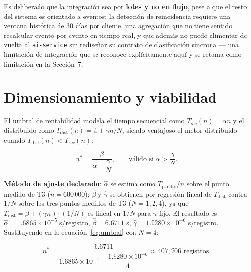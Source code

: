\documentclass[11pt]{article}
\begin{document}
Es deliberado que la integración sea por \textbf{lotes y no en flujo},
pese a que el resto del sistema es orientado a eventos: la detección de
reincidencia requiere una ventana histórica de 30 días por cliente, una
agregación que no tiene sentido recalcular evento por evento en tiempo
real, y que además no puede alimentar de vuelta al \texttt{ai-service}
sin rediseñar su contrato de clasificación síncrona --- una limitación
de integración que se reconoce explícitamente aquí y se retoma como
limitación en la Sección~7.


\section{Dimensionamiento y viabilidad}


El umbral de rentabilidad modela el tiempo secuencial como
$T_{\mathrm{sec}}(n)=\alpha n$ y el distribuido como
$T_{\mathrm{dist}}(n)=\beta+\gamma n/N$, siendo ventajoso el motor
distribuido cuando $T_{\mathrm{dist}}(n) < T_{\mathrm{sec}}(n)$:

\begin{equation}
n^{*} = \frac{\beta}{\alpha - \dfrac{\gamma}{N}},
\qquad \text{válido si } \alpha > \frac{\gamma}{N}.
\label{eq:umbral}
\end{equation}

\textbf{Método de ajuste declarado}: $\hat\alpha$ se estima como
$T_{\mathrm{pandas}}/n$ sobre el punto medido de T3 ($n=600\,000$);
$\hat\beta$ y $\hat\gamma$ se obtienen por regresión lineal de
$T_{\mathrm{dist}}$ contra $1/N$ sobre los tres puntos medidos de T3
($N=1,2,4$), ya que $T_{\mathrm{dist}}=\beta+(\gamma n)\cdot(1/N)$ es
lineal en $1/N$ para $n$ fijo. El resultado es
$\hat\alpha=1.6865\times10^{-5}$ \si{\second}/registro,
$\hat\beta=6.6711$ \si{\second}, $\hat\gamma=1.9280\times10^{-6}$
\si{\second}/registro. Sustituyendo en la ecuación~\eqref{eq:umbral}
con $N=4$:

\begin{equation}
n^{*} = \frac{6.6711}{1.6865\times10^{-5} - \dfrac{1.9280\times10^{-6}}{4}}
       \approx 407{,}206 \text{ registros.}
\end{equation}
\end{document}
